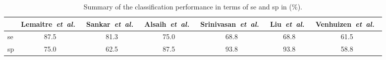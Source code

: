 \begin{table*}
  \centering
  \caption{Summary of the classification performance in terms of \gls{se} and \gls{sp} in (\%).}
  \begin{tabular}{l c c c c c c}
    \toprule
    & Lemaitre~\emph{et~al.}~\cite{Lemaintre2015miccaiOCT}
    & Sankar~\emph{et~al.}~\cite{sankar2016classification}
    & Alsaih~\emph{et~al.}~\cite{Alsaih2016apr-repoICPR}
    & Srinivasan~\emph{et~al.}~\cite{Srinivasan2014}
    & Liu~\emph{et~al.}~\cite{Liu2011}
    & Venhuizen~\emph{et~al.}~\cite{Venhuizen2015}
    \\ \midrule

    \gls{se}  & 87.5  & 81.3    & 75.0   & 68.8  & 68.8  & 61.5  \\
    \gls{sp}  & 75.0  & 62.5    & 87.5   & 93.8  & 93.8  & 58.8  \\
    \bottomrule
    \end{tabular}
    \label{tab:summary_results}
\end{table*}

